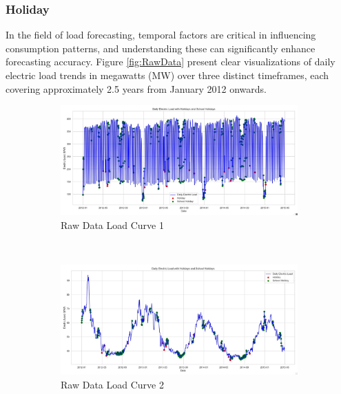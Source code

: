 \documentclass{article} %
\begin{document}
\subsubsection{Holiday}
In the field of load forecasting, temporal factors are critical in influencing consumption patterns, and understanding these can significantly enhance forecasting accuracy. Figure \ref{fig:RawData} present clear visualizations of daily electric load trends in megawatts (MW) over three distinct timeframes, each covering approximately 2.5 years from January 2012 onwards. 
\begin{figure}[!htb]
    \centering
    \begin{subfigure}[b]{\textwidth}
        \centering
        \includegraphics[width=\textwidth]{ressources/Holiday/lectricLoad_holiday.jpg}
        \caption{Raw Data Load Curve 1}
        \label{fig:RawData1}
    \end{subfigure}
    \\
    \begin{subfigure}[b]{\textwidth}
        \centering
        \includegraphics[width=\textwidth]{ressources/Holiday/lectricLoad_holiday(1).jpg}
        \caption{Raw Data Load Curve 2}
        \label{fig:RawData2}
    \end{subfigure}
    \\
    \begin{subfigure}[b]{\textwidth}

\end{subfigure}
\end{figure}
\end{document}
